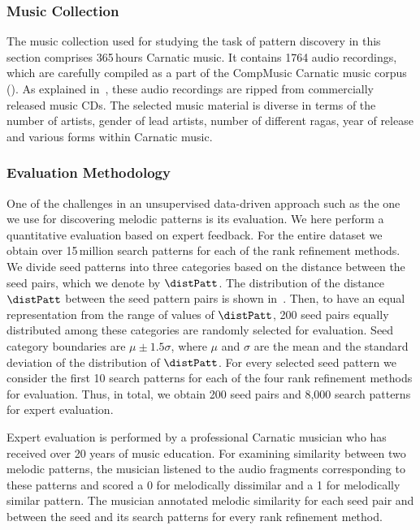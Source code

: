 \subsubsection{Music Collection}
\label{sec:pattern_discovery_musiccollection}

The music collection used for studying the task of pattern discovery in this section comprises 365\,hours Carnatic music. It contains 1764 audio recordings, which are carefully compiled as a part of the CompMusic Carnatic music corpus (). As explained in~, these audio recordings are ripped from commercially released music CDs. The selected music material is diverse in terms of the number of artists, gender of lead artists, number of different \glspl{raga}, year of release and various forms within Carnatic music.


\subsubsection{Evaluation Methodology}
\label{sec:evaluationmethodology}

One of the challenges in an unsupervised data-driven approach such as the one we use for discovering melodic patterns is its evaluation. We here perform a quantitative evaluation based on expert feedback. For the entire dataset we obtain over 15\,million search patterns for each of the rank refinement methods. We divide seed patterns into three categories based on the distance between the seed pairs, which we denote by $\distPatt$. The distribution of the distance $\distPatt$ between the seed pattern pairs is shown in~. Then, to have an equal representation from the range of values of $\distPatt$, 200 seed pairs equally distributed among these categories are randomly selected for evaluation. Seed category boundaries are $\mu \pm 1.5\sigma$, where $\mu$ and $\sigma$ are the mean and the standard deviation of the distribution of $\distPatt$. For every selected seed pattern we consider the first 10 search patterns for each of the four rank refinement methods for evaluation. Thus, in total, we obtain 200 seed pairs and 8,000 search patterns for expert evaluation.

Expert evaluation is performed by a professional Carnatic musician who has received over 20 years of music education. For examining similarity between two melodic patterns, the musician listened to the audio fragments corresponding to these patterns and scored a 0 for melodically dissimilar and a 1 for melodically similar pattern. The musician annotated melodic similarity for each seed pair and between the seed and its search patterns for every rank refinement method.


